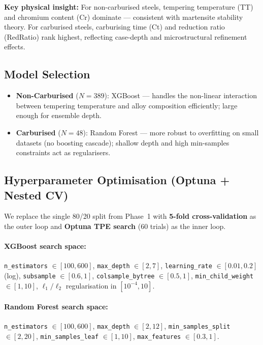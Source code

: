 \documentclass[12pt,a4paper]{article}
\begin{document}
\textbf{Key physical insight:} For non-carburised steels, tempering temperature (TT) and
chromium content (Cr) dominate — consistent with martensite stability theory. For carburised
steels, carburising time (Ct) and reduction ratio (RedRatio) rank highest, reflecting
case-depth and microstructural refinement effects.

\subsection{Model Selection}

\begin{itemize}[nosep]
  \item \textbf{Non-Carburised} ($N=389$): XGBoost — handles the non-linear interaction between
        tempering temperature and alloy composition efficiently; large enough for ensemble depth.
  \item \textbf{Carburised} ($N=48$): Random Forest — more robust to overfitting on small datasets
        (no boosting cascade); shallow depth and high min-samples constraints act as regularisers.
\end{itemize}

\subsection{Hyperparameter Optimisation (Optuna + Nested CV)}

We replace the single 80/20 split from Phase~1 with \textbf{5-fold cross-validation} as the outer
loop and \textbf{Optuna TPE search} (60 trials) as the inner loop.

\paragraph{XGBoost search space:}
\texttt{n\_estimators} $\in [100,600]$,
\texttt{max\_depth} $\in [2,7]$,
\texttt{learning\_rate} $\in [0.01,0.2]$ (log),
\texttt{subsample} $\in [0.6,1]$,
\texttt{colsample\_bytree} $\in [0.5,1]$,
\texttt{min\_child\_weight} $\in [1,10]$,
$\ell_1/\ell_2$ regularisation in $[10^{-4},10]$.

\paragraph{Random Forest search space:}
\texttt{n\_estimators} $\in [100,600]$,
\texttt{max\_depth} $\in [2,12]$,
\texttt{min\_samples\_split} $\in [2,20]$,
\texttt{min\_samples\_leaf} $\in [1,10]$,
\texttt{max\_features} $\in [0.3,1]$.
\end{document}
